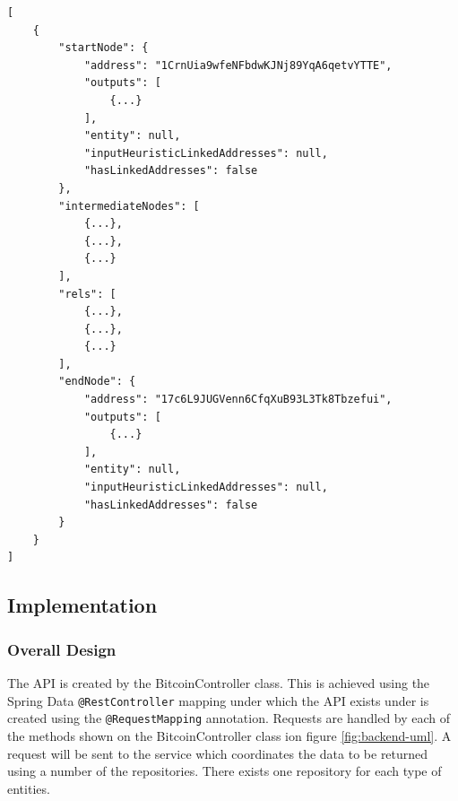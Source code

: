 \begin{lstlisting}[label={lst:path-find-response}, caption={Response to a path find query}, breaklines=true, basicstyle=\small]
[
    {
        "startNode": {
            "address": "1CrnUia9wfeNFbdwKJNj89YqA6qetvYTTE",
            "outputs": [
                {...}
            ],
            "entity": null,
            "inputHeuristicLinkedAddresses": null,
            "hasLinkedAddresses": false
        },
        "intermediateNodes": [
            {...},
            {...},
            {...}
        ],
        "rels": [
            {...},
            {...},
            {...}
        ],
        "endNode": {
            "address": "17c6L9JUGVenn6CfqXuB93L3Tk8Tbzefui",
            "outputs": [
                {...}
            ],
            "entity": null,
            "inputHeuristicLinkedAddresses": null,
            "hasLinkedAddresses": false
        }
    }
]
\end{lstlisting}

\subsection{Implementation} 
\subsubsection{Overall Design}
The API is created by the BitcoinController class. This is achieved using the Spring Data \texttt{@RestController} mapping under which the API exists under is created using the \texttt{@RequestMapping} annotation. Requests are handled by each of the methods shown on the BitcoinController class ion figure \ref{fig:backend-uml}. A request will be sent to the service which coordinates the data to be returned using a number of the repositories. There exists one repository for each type of entities. 

